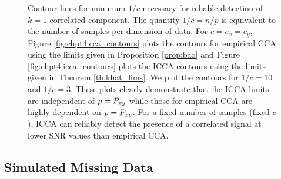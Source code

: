 \begin{figure}
  \begin{center}
    \caption{Contour lines for minimum $1/c$ necessary for reliable detection of $k=1$
      correlated component. The quantity $1/c = n/p$ is equivalent to the number of
      samples per dimension of data. For $c=c_x=c_y$, Figure \ref{fig:chpt4:cca_contours} plots the
      contours for empirical CCA using the limits given in Proposition \ref{prop:bao} and
      Figure \ref{fig:chpt4:icca_contours} plots the ICCA contours using the limits given
      in Theorem \ref{th:khat_lims}. We plot the contours for $1/c=10$ and
      $1/c=3$.  These plots clearly demonstrate that the ICCA limits are independent of
      $\rho=P_{xy}$ while those for empirical CCA are highly dependent on $\rho=P_{xy}$. For a fixed number of
      samples (fixed $c$), ICCA can reliably detect the presence of a correlated signal at
      lower SNR values than empirical CCA.}
    \label{fig:chpt4:contours}
  \end{center}
\end{figure}


\subsection{Simulated Missing Data}

